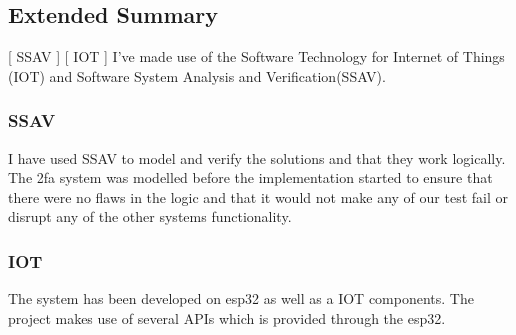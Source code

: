 \subsection*{Extended Summary}
[ SSAV ] [ IOT ]
\newline
I've made use of the Software Technology for Internet of Things (IOT) and Software System Analysis and Verification(SSAV).

\subsubsection{SSAV} I have used SSAV to model and verify the solutions and that they work logically. The \gls{2fa} system was modelled before the implementation started to ensure that there were no flaws in the logic and that it would not make any of our test fail or disrupt any of the other systems functionality.

\subsubsection{IOT} The system has been developed on esp32 as well as a IOT components. The project makes use of several APIs which is provided through the esp32.